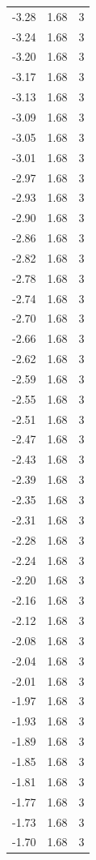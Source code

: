 \begin{longtable}{lrr}
  -3.28 & 1.68 & 3 \\
  -3.24 & 1.68 & 3 \\
  -3.20 & 1.68 & 3 \\
  -3.17 & 1.68 & 3 \\
  -3.13 & 1.68 & 3 \\
  -3.09 & 1.68 & 3 \\
  -3.05 & 1.68 & 3 \\
  -3.01 & 1.68 & 3 \\
  -2.97 & 1.68 & 3 \\
  -2.93 & 1.68 & 3 \\
  -2.90 & 1.68 & 3 \\
  -2.86 & 1.68 & 3 \\
  -2.82 & 1.68 & 3 \\
  -2.78 & 1.68 & 3 \\
  -2.74 & 1.68 & 3 \\
  -2.70 & 1.68 & 3 \\
  -2.66 & 1.68 & 3 \\
  -2.62 & 1.68 & 3 \\
  -2.59 & 1.68 & 3 \\
  -2.55 & 1.68 & 3 \\
  -2.51 & 1.68 & 3 \\
  -2.47 & 1.68 & 3 \\
  -2.43 & 1.68 & 3 \\
  -2.39 & 1.68 & 3 \\
  -2.35 & 1.68 & 3 \\
  -2.31 & 1.68 & 3 \\
  -2.28 & 1.68 & 3 \\
  -2.24 & 1.68 & 3 \\
  -2.20 & 1.68 & 3 \\
  -2.16 & 1.68 & 3 \\
  -2.12 & 1.68 & 3 \\
  -2.08 & 1.68 & 3 \\
  -2.04 & 1.68 & 3 \\
  -2.01 & 1.68 & 3 \\
  -1.97 & 1.68 & 3 \\
  -1.93 & 1.68 & 3 \\
  -1.89 & 1.68 & 3 \\
  -1.85 & 1.68 & 3 \\
  -1.81 & 1.68 & 3 \\
  -1.77 & 1.68 & 3 \\
  -1.73 & 1.68 & 3 \\
  -1.70 & 1.68 & 3 \\

\end{longtable}
